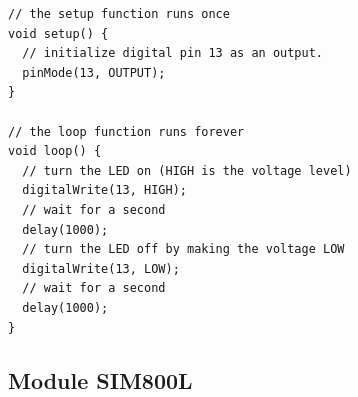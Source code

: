 	\begin{lstlisting}[caption=Đoạn code nháy đèn căn bản]
// the setup function runs once
void setup() {
  // initialize digital pin 13 as an output.
  pinMode(13, OUTPUT);
}

// the loop function runs forever
void loop() {
  // turn the LED on (HIGH is the voltage level)
  digitalWrite(13, HIGH);   
  // wait for a second
  delay(1000);    
  // turn the LED off by making the voltage LOW          
  digitalWrite(13, LOW);    
  // wait for a second
  delay(1000);              
}

	\end{lstlisting}







\subsection{Module SIM800L}
